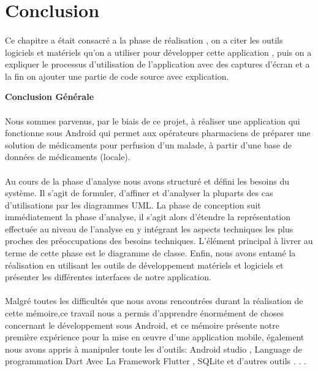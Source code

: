 \documentclass[12pt, openany]{report}
\begin{document}
\section{Conclusion}
\paragraph{}Ce chapitre a était consacré a la phase de réalisation , on a citer les outils logiciels et matériels qu'on a utiliser pour développer cette application , puis on a expliquer le processus d'utilisation de l'application avec des captures d'écran et a la fin on ajouter une partie de code source avec explication.

\newpage
\begin{center}
	\textsf{ \huge \textbf{Conclusion Générale}}
\end{center}
\large \paragraph{} 
Nous sommes parvenus, par le biais de ce projet, à réaliser une application qui fonctionne sous Android qui permet aux opérateurs pharmaciens de préparer une solution de médicaments pour perfusion d'un malade, à partir d'une base de données de médicaments (locale).
\paragraph{}Au cours de la phase d'analyse nous avons structuré et défini les besoins du système.
Il s'agit de formuler, d'affiner et d'analyser la pluparts des cas d'utilisations par les diagrammes UML.
La phase de conception suit immédiatement la phase d'analyse, il s'agit alors d'étendre la représentation effectuée au niveau de l'analyse en y intégrant les aspects techniques les plus proches des préoccupations des besoins techniques. L'élément principal à livrer au terme de cette phase est le diagramme de classe.
Enfin, nous avons entamé la réalisation en utilisant les outils de développement matériels et logiciels et présenter les différentes interfaces de notre application.
\paragraph{}Malgré toutes les difficultés que nous avons rencontrées durant la réalisation de cette mémoire,ce travail nous a permis d'apprendre énormément de choses concernant le développement sous Android, et ce mémoire présente notre première expérience pour la mise en œuvre d'une application mobile, également nous avons appris à manipuler toute les d'outils: Android studio , Language de programmation Dart Avec La Framework Flutter , SQLite et d'autres outils . . . 
\end{document}
